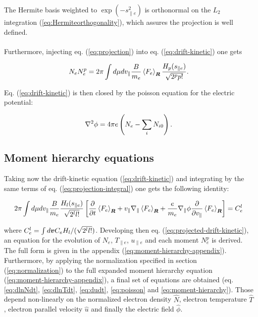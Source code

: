 \documentclass[final]{jpp}
\begin{document}
The Hermite basis weighted to $\exp(-s_{\parallel e}^2)$ is orthonormal on the $L_2$ integration (\ref{eq:Hermiteorthogonality}), which assures the projection is well defined.
\\
\\
Furthermore, injecting eq. (\ref{eq:projection}) into eq. (\ref{eq:drift-kinetic}) one gets 

\begin{equation} \label{eq:projection-integral}
N_e N_e^p = 2 \pi \int d \mu d v_{\parallel} \frac{B}{m_e} \left< F_e \right>_{\bm{R}} \frac{H_p(s_{\parallel e})}{\sqrt{2^p p!}}.
\end{equation}

Eq. (\ref{eq:drift-kinetic}) is then closed by the poisson equation for the electric potential:

\begin{align} \label{eq:full-poisson}
\nabla^2 \phi = 4 \pi e \left( N_{e} - \sum_iN_{i0}\right).
\end{align}

\subsection{Moment hierarchy equations}

Taking now the drift-kinetic equation (\ref{eq:drift-kinetic}) and integrating by the same terms of eq. (\ref{eq:projection-integral}) one gets the following identity:

\begin{equation} \label{eq:projected-drift-kinetic}
    2 \pi \int d \mu d v_{\parallel} \frac{B}{m_e}\frac{H_l(s_{\parallel e})}{\sqrt{2^l l!}} \left[ \frac{\partial}{\partial t} \left< F_e \right>_{\bm{R}} + v_\parallel \nabla_\parallel \left< F_e \right>_{\bm{R}} + \frac{e}{m_e} \nabla_\parallel \phi \frac{\partial }{ \partial v_{\parallel}} \left< F_e \right>_{\bm{R}} \right] =C_e^l
\end{equation}

where $C_e^l = \int d \bm{v} C_e H_l/(\sqrt{2^ll!})$.
Developing then eq. (\ref{eq:projected-drift-kinetic}),
an equation for the evolution of $N_e$, $T_{\parallel e}$, $u_{\parallel e}$ and each moment $N_e^p$ is derived. The full form is given in the appendix (\ref{eq:moment-hierarchy-appendix}). 
Furthermore, by applying the normalization specified in section (\ref{eq:normalization}) to the full expanded moment hierarchy equation (\ref{eq:moment-hierarchy-appendix}), a final set of equations are obtained (eq. \ref{eq:dlnNdt}, \ref{eq:dlnTdt}, \ref{eq:dudt}, \ref{eq:poisson} and \ref{eq:moment-hierarchy}). Those depend non-linearly on the normalized electron density $\hat{N}$, electron temperature $\hat{T}$, electron parallel velocity $\hat{u}$ and finally the electric field $\hat{\phi}$. 
\end{document}
